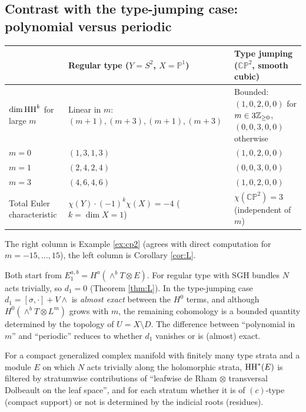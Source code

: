 \subsection{Contrast with the type-jumping case: polynomial versus periodic}\label{subsec:contrast}
\begin{center}\small
\begin{tabular}{>{\raggedright\arraybackslash}p{3.4cm}>{\raggedright\arraybackslash}p{4.4cm}>{\raggedright\arraybackslash}p{5.8cm}}\toprule
 & Regular type ($Y=S^2$, $X=\mathbb P^1$) & Type jumping ($\mathbb{CP}^2$, smooth cubic)\\\midrule
$\dim\mathrm{HH}^k$ for large $m$ & Linear in $m$: $(m+1),(m+3),(m+1),(m+3)$ & Bounded: $(1,0,2,0,0)$ for $m\in3\mathbb Z_{\ge0}$, $(0,0,3,0,0)$ otherwise\\\midrule
$m=0$ & $(1,3,1,3)$ & $(1,0,2,0,0)$\\\midrule
$m=1$ & $(2,4,2,4)$ & $(0,0,3,0,0)$\\\midrule
$m=3$ & $(4,6,4,6)$ & $(1,0,2,0,0)$\\\midrule
Total Euler characteristic & $\chi(Y)\cdot(-1)^{k}\chi(X)=-4$ ($k=\dim X=1$) & $\chi(\mathbb{CP}^2)=3$ (independent of $m$)\\\bottomrule
\end{tabular}
\end{center}
\tV The right column is Example \ref{ex:cp2} (agrees with direct computation for $m=-15,\dots,15$), the left column is Corollary \ref{cor:L}.
\begin{obs}\tP\label{obs:contrast}
Both start from $E_1^{a,b}=H^a(\wedge^bT\otimes E)$. For regular type with SGH bundles $N$ acts trivially, so $d_1=0$ (Theorem \ref{thm:L}). In the type-jumping case $d_1=[\sigma,\cdot]+V\wedge$ is \emph{almost exact} between the $H^0$ terms, and although $H^0(\wedge^bT\otimes L^m)$ grows with $m$, the remaining cohomology is a bounded quantity determined by the topology of $U=X\setminus D$. The difference between ``polynomial in $m$'' and ``periodic'' reduces to whether $d_1$ vanishes or is (almost) exact.
\end{obs}
\begin{conj}\tK\label{conj:U}
For a compact generalized complex manifold with finitely many type strata and a module $E$ on which $N$ acts trivially along the holomorphic strata, $\mathrm{HH}^*(E)$ is filtered by stratumwise contributions of ``leafwise de Rham $\otimes$ transversal Dolbeault on the leaf space'', and for each stratum whether it is of $(c)$-type (compact support) or not is determined by the indicial roots (residues).
\end{conj}
